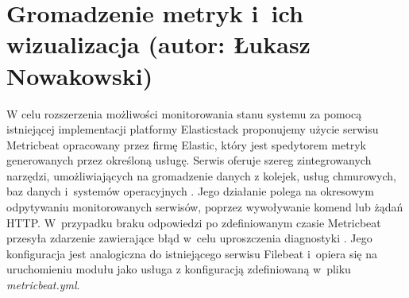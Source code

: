 \section{Gromadzenie metryk i~ich wizualizacja (autor: Łukasz Nowakowski)}
W celu rozszerzenia możliwości monitorowania stanu systemu za pomocą istniejącej implementacji platformy Elasticstack proponujemy użycie serwisu Metricbeat opracowany przez firmę Elastic, który jest spedytorem metryk generowanych przez określoną usługę. Serwis oferuje szereg zintegrowanych narzędzi, umożliwiających na gromadzenie danych z kolejek, usług chmurowych, baz danych i~systemów operacyjnych \cite{metricbeat}. Jego działanie polega na okresowym odpytywaniu monitorowanych serwisów, poprzez wywoływanie komend lub żądań HTTP. W~przypadku braku odpowiedzi po zdefiniowanym czasie Metricbeat przesyła zdarzenie zawierające błąd w~celu uproszczenia diagnostyki \cite{metricbeat_work}. Jego konfiguracja jest analogiczna do istniejącego serwisu Filebeat i~opiera się na uruchomieniu modułu jako usługa z konfiguracją zdefiniowaną w~pliku \textit{metricbeat.yml}.
